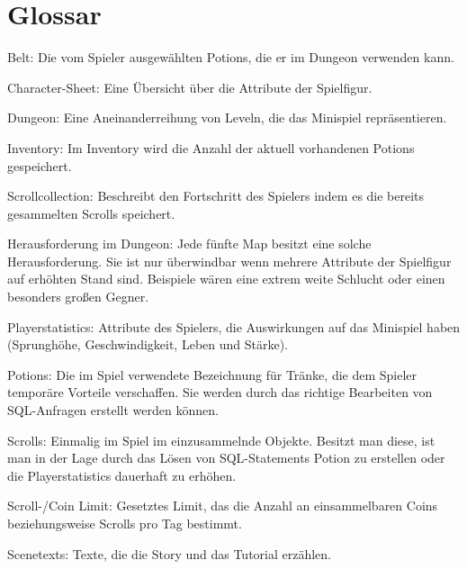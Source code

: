 
\chapter{Glossar}

Belt: Die vom Spieler ausgew\"ahlten Potions, die er im Dungeon verwenden kann.

Character-Sheet: Eine \"Ubersicht \"uber die Attribute der Spielfigur.

Dungeon: Eine Aneinanderreihung von Leveln, die das Minispiel repr\"asentieren. 

Inventory: Im Inventory wird die Anzahl der aktuell vorhandenen Potions gespeichert.

Scrollcollection: Beschreibt den Fortschritt des Spielers indem es die bereits gesammelten Scrolls speichert. 

Herausforderung im Dungeon: Jede f\"unfte Map besitzt eine solche Herausforderung. Sie ist nur \"uberwindbar wenn mehrere Attribute der Spielfigur auf erh\"ohten Stand sind. Beispiele w\"aren eine extrem weite Schlucht oder einen besonders gro{\ss}en Gegner.

Playerstatistics: Attribute des Spielers, die Auswirkungen auf das Minispiel haben (Sprungh\"ohe, Geschwindigkeit, Leben und St\"arke).

Potions: Die im Spiel verwendete Bezeichnung f\"ur Tr\"anke, die dem Spieler tempor\"are Vorteile
verschaffen. Sie werden durch das richtige Bearbeiten von SQL-Anfragen erstellt werden k\"onnen. 

Scrolls: Einmalig im Spiel im einzusammelnde Objekte. Besitzt man diese, ist man in der Lage durch das L\"osen von SQL-Statements Potion zu erstellen oder die Playerstatistics dauerhaft zu erh\"ohen. 

Scroll-/Coin Limit: Gesetztes Limit, das die Anzahl an einsammelbaren Coins beziehungsweise Scrolls pro Tag bestimmt.

Scenetexts: Texte, die die Story und das Tutorial erz\"ahlen.
